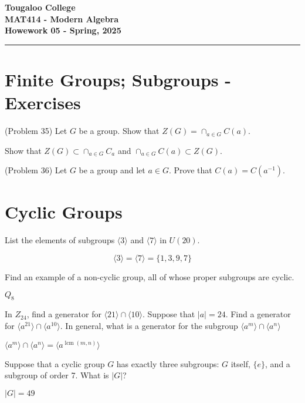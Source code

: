\documentclass[12pt]{exam}
\newcommand{\paper}[5]{
    \setcounter{page}{1}
    
    \begin{minipage}{\textwidth}
    \Large{\textbf{Tougaloo College}}\\
    \textbf{#2}\\
    \textbf{#5 - #3}\\
    \end{minipage}
    \hfill
    
    \vspace{0.1in}
    \rule[1ex]{\textwidth}{2pt}
    }
\begin{document}
\paper{03//2025}{MAT414 - Modern Algebra}{Spring, 2025}{}{Howework 05}

\section*{Finite Groups; Subgroups - Exercises}
\begin{questions}



\question[20] (Problem 35) Let \(G\) be a group. Show that \(Z(G)=\cap_{a \in G} C(a)\).

\begin{solution}
    Show that \(Z(G) \subset \cap_{a\in G}C_a\) and \(\cap_{a\in G} C(a) \subset Z(G)\).
\end{solution}
\droptotalpoints

\question[20] (Problem 36) Let \(G\) be a group and let \(a \in G\). Prove that \(C(a) = C(a^{-1}).\)

\section*{Cyclic Groups}

\question[] List the elements of subgroups \(\langle 3 \rangle\) and \(\langle  7 \rangle\) in \(U(20)\).

\begin{solution}
    \[ \langle 3 \rangle = \langle 7 \rangle= \{1,3,9,7\}\]
\end{solution}

\question[] Find an example of a non-cyclic group, all of  whose proper subgroups are cyclic. 

\begin{solution}
    \(Q_8\)
\end{solution}

\question[] In \(Z_{24}\), find a generator for \(\langle 21 \rangle \cap \langle 10 \rangle\). Suppose that \(|a|=24\). Find a generator for \(\langle a^{21} \rangle \cap \langle a^{10} \rangle\). In general, what is a generator for the subgroup \(\langle a^{m}\rangle \cap \langle a^n \rangle\)

\begin{solution}
    \(\langle a^m\rangle \cap \langle a^n \rangle = \langle a^{\operatorname{lcm}(m,n)} \rangle\)
\end{solution}


\question[] Suppose that a cyclic group \(G\) has exactly three subgroups: \(G\) itself, \(\{e\}\), and a subgroup of order 7. What is \(|G|\)? 

\begin{solution}
    \(|G|=49\)
\end{solution}






\end{questions}
\end{document}

